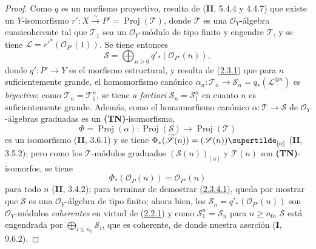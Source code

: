 \begin{proof}
Como $q$ es un morfismo proyectivo, resulta de (\textbf{II}, 5.4.4 y 4.4.7) que existe un $Y$-isomorfismo $r':X\xrightarrow{\sim}P'=\operatorname{Proj}(\mathcal T)$, donde $\mathcal T$ es una $\mathcal O_Y$-álgebra cuasicoherente tal que $\mathcal T_1$ sea un $\mathcal O_Y$-módulo de tipo finito y engendre $\mathcal T$, y se tiene $\mathcal L=r'^*(\mathcal O_{P'}(1))$. Se tiene entonces
\[
\mathcal S=\bigoplus_{n\geq0}q'_*(\mathcal O_{P'}(n)),
\]
donde $q':P'\to Y$ es el morfismo estructural, y resulta de (\hyperref[III.2.3.1-fr]{2.3.1}) que para $n$ suficientemente grande, el homomorfismo canónico $\alpha_n:\mathcal T_n\to\mathcal S_n=q_*(\mathcal L^{\otimes n})$ es \emph{biyectivo}; como $\mathcal T_n=\mathcal T_1^n$, se tiene \emph{a fortiori} $\mathcal S_n=\mathcal S_1^n$ en cuanto $n$ es suficientemente grande. Además, como el homomorfismo canónico $\alpha:\mathcal T\to\mathcal S$ de $\mathcal O_Y$-álgebras graduadas es un \textbf{(TN)}-isomorfismo,
\label{III.2.3.5.1-fr}
\[
\Phi=\operatorname{Proj}(\alpha):
\operatorname{Proj}(\mathcal S)\longrightarrow
\operatorname{Proj}(\mathcal T)
\]
es un isomorfismo (\textbf{II}, 3.6.1) y se tiene $\Phi_*(\widetilde{\mathcal S}(n))=(\mathcal S(n))\supertilde_{[\alpha]}$ (\textbf{II}, 3.5.2); pero como los $\mathcal T$-módulos graduados $(\mathcal S(n))_{[\alpha]}$ y $\mathcal T(n)$ son \textbf{(TN)}-isomorfos, se tiene \[
\Phi_*(\mathcal O_P(n))=\mathcal O_{P'}(n)
\] para todo $n$ (\textbf{II}, 3.4.2); para terminar de demostrar (\hyperref[III.2.3.4.1-fr]{2.3.4.1}), queda por mostrar que $\mathcal S$ es una $\mathcal O_Y$-álgebra de tipo finito; ahora bien, los $\mathcal S_n=q'_*(\mathcal O_{P'}(n))$ son $\mathcal O_Y$-módulos \emph{coherentes} en virtud de (\hyperref[III.2.2.1-fr]{2.2.1}) y como $\mathcal S_1^n=\mathcal S_n$ para $n\geq n_0$, $\mathcal S$ está engendrada por $\bigoplus_{i\leq n_0}\mathcal S_i$, que es coherente, de donde nuestra aserción (\textbf{I}, 9.6.2).


\end{proof}
